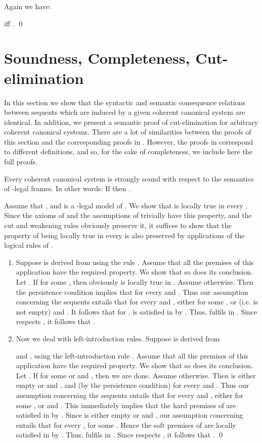 \documentclass{LMCS}
\theoremstyle{remark}
\newcommand{\bi}{\begin{enumerate}[]}
\newcommand{\ei}{\end{enumerate}}
\begin{document}
\noindent
Again we have:

\begin{prop}
\label{reduction2}
 iff .
\qed
\end{prop}


\section{Soundness, Completeness, Cut-elimination}
In this section we show that the syntactic and semantic consequence relations between sequents
which are induced by a given coherent canonical system are identical.
In addition, we present a semantic proof of cut-elimination for arbitrary coherent canonical systems.
There are a lot of similarities between the proofs of this section and the corresponding proofs in 
\cite{AL10}. However, the proofs in \cite{AL10} correspond to different definitions,
and so, for the sake of completeness, we include here the full proofs.

\begin{thm}
\label{soundness}
Every coherent canonical system 
is strongly sound with respect to the semantics
of -legal frames. In other words:
If  then .
\end{thm}

\sloppy
\proof
Assume that , 
and  is a -legal model of . 
We show that  is locally true in every  .
Since the axioms of  and the assumptions of  trivially
have this property, and the cut and weakening rules obviously preserve it,
it suffices to show that the property of being locally true in every 
is also preserved by applications of the logical rules of .
\bi
\item 
Suppose 
is derived from 
using the rule
.
Assume that all the premises of this application have the required property.
We show that so does its conclusion. 
Let . 
If  for some , then obviously  
 is locally true in . 
Assume otherwise. 
Then the persistence condition implies that
 for every  and .
Thus our assumption concerning the sequents
 entails
that for every  and , either  for
some , or  
(i.e.  is not empty) and . 
It follows that for , 
is satisfied in  by .
Thus,  fulfils  in .
Since  respects , 
it follows that .
\item
Now we deal with left-introduction rules.
Suppose  is derived from
 
and ,
using the left-introduction rule 
.
Assume that all the premises of this application have the required property.
We show that so does its conclusion. 
Let . 
If  for some  
or  and , then we are done. 
Assume otherwise. 
Then  is either empty or  and ,
and (by the persistence condition)
 for every  and .
Thus our assumption concerning the sequents
 entails
that for every  and , either  for
some , or  and .
This immediately implies that the hard premises of  are satisfied in  by . 
Since  is either empty or 
and , our assumption concerning
 entails
that for every ,
 for some .
Hence the soft premises of  are locally satisfied in  by .
Thus,  fulfils  in .
Since  respects , 
it follows that .
\qed\ei
\fussy
\end{document}

